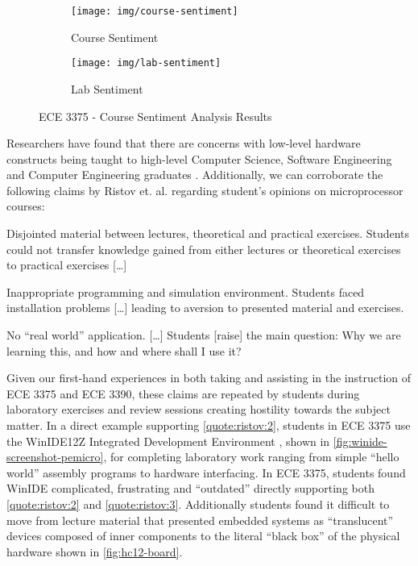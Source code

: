 \begin{figure}
    \centering
    \begin{subfigure}{.8\linewidth}
        \centering
        \texttt{[image: img/course-sentiment]}
        \caption{Course Sentiment}
        \label{fig:ece-3375-course-sentiment}
    \end{subfigure}
    
    \begin{subfigure}{.8\linewidth}
        \centering
        \texttt{[image: img/lab-sentiment]}
        \caption{Lab Sentiment}
        \label{fig:ece-3375-lab-sentiment}
    \end{subfigure}
    
    \caption{ECE 3375 - Course Sentiment Analysis Results \cite{evals:ece3375-2013, evals:ece3375-2014}}
\end{figure}

Researchers have found that there are concerns with low-level hardware constructs being taught to high-level Computer Science, Software Engineering and Computer Engineering graduates \cite{Ristov2011, Stolikj2011}. Additionally, we can corroborate the following claims by Ristov et. al. \cite{Ristov2011} regarding student's opinions on microprocessor courses: 
\begin{displayquote}
    \begin{observations}
        \item Disjointed material between lectures, theoretical and practical
        exercises. Students could not transfer knowledge gained from either lectures or theoretical exercises to practical exercises [\dots] 
            \label{quote:ristov:1}
        \item Inappropriate programming and simulation environment. Students faced installation problems [\dots] leading to aversion to presented material and exercises.
            \label{quote:ristov:2}
        \item No ``real world'' application. [\dots] Students [raise] the main question: Why we are learning this, and how and where shall I use it?
            \label{quote:ristov:3}
    \end{observations}
\end{displayquote}
Given our first-hand experiences in both taking and assisting in the instruction of ECE 3375 and ECE 3390, these claims are repeated by students during laboratory exercises and review sessions creating hostility towards the subject matter. In a direct example supporting \cref{quote:ristov:2}, students in ECE 3375 use the WinIDE12Z Integrated Development Environment \cite{winide}, shown in \cref{fig:winide-screenshot-pemicro}, for completing laboratory work ranging from simple ``hello world'' assembly programs to hardware interfacing. In ECE 3375, students found WinIDE complicated, frustrating and ``outdated'' \cite{evals:ece3375-2013, evals:ece3375-2014} directly supporting both \cref{quote:ristov:2} and \cref{quote:ristov:3}. Additionally students found it difficult to move from lecture material that presented embedded systems as ``translucent'' devices composed of inner components to the literal ``black box'' of the physical hardware shown in \cref{fig:hc12-board}. 

